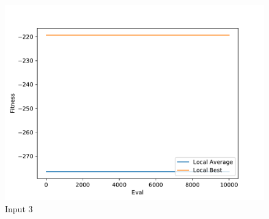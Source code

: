\documentclass{standalone}
\begin{document}
\begin{figure}[!htb]
	\caption{Input 3}
	\label{fig:graph_3005}
	\includegraphics[width=\textwidth]{../graphs/graphs/3005.pdf}
\end{figure}
\end{document}
